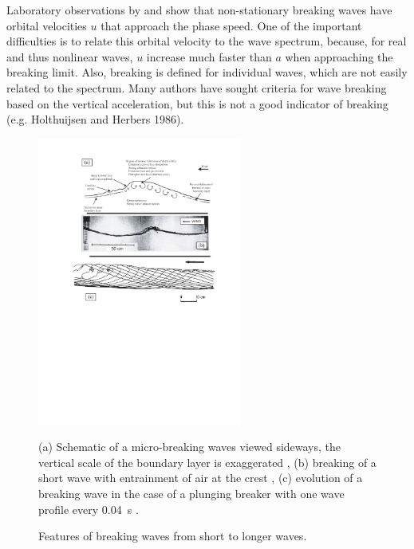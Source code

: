 Laboratory observations by 
\cite{Melville&Rapp1988} and \cite{Stansell&MacFarlane2002} show that non-stationary breaking waves have 
orbital velocities $u$ that approach the phase speed. One of the important difficulties is to relate this orbital velocity to the wave spectrum, because, 
for real and thus nonlinear waves, 
$u$ increase much faster than $a$ when approaching the breaking limit. 
Also, breaking is defined for individual waves, which are not easily related to the spectrum. Many authors have sought criteria for wave breaking 
based on the vertical acceleration, but this is not a good indicator of breaking  (e.g.
Holthuijsen and Herbers 1986\nocite{Holthuijsen&Herbers1986}).
\begin{figure}[htb]
\centerline{\includegraphics[width=0.6\textwidth]{FIGS_CH_SOURCETERMS/breaking_basic.pdf}}
\caption{Features of breaking waves from short to longer waves.}{(a) Schematic of a micro-breaking waves viewed sideways, the vertical scale 
of the boundary layer is exaggerated \citep[from][\copyright Cambridge University
Press]{Siddiqui&Loewen2007}, (b) breaking of a short wave with entrainment of air at the crest \citep[from][]{Koga1982}, (c) evolution 
of a breaking wave in the case of a plunging breaker with one wave profile every  0.04~s
\citep[from][\copyright Cambridge University
Press]{Bonmarin1989}
}.\label{figbreaking1}
\end{figure}


